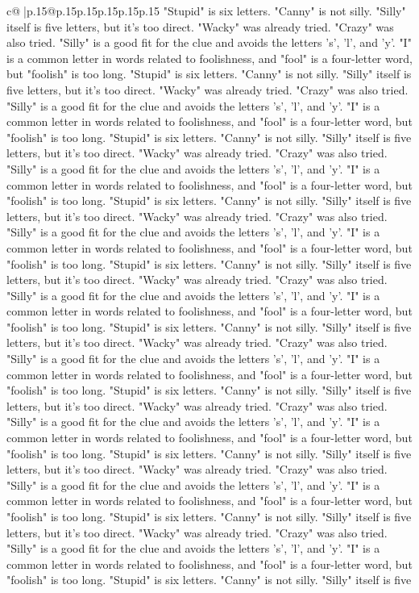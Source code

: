 \documentclass{article}
\begin{document}
{\begin{supertabular}{c@{$\;$}|p{.15\linewidth}@{}p{.15\linewidth}p{.15\linewidth}p{.15\linewidth}p{.15\linewidth}p{.15\linewidth}}
{{{"Stupid" is six letters. "Canny" is not silly. "Silly" itself is five letters, but it's too direct. "Wacky" was already tried. "Crazy" was also tried. "Silly" is a good fit for the clue and avoids the letters 's', 'l', and 'y'. "I" is a common letter in words related to foolishness, and "fool" is a four{-}letter word, but "foolish" is too long. "Stupid" is six letters. "Canny" is not silly. "Silly" itself is five letters, but it's too direct. "Wacky" was already tried. "Crazy" was also tried. "Silly" is a good fit for the clue and avoids the letters 's', 'l', and 'y'. "I" is a common letter in words related to foolishness, and "fool" is a four{-}letter word, but "foolish" is too long. "Stupid" is six letters. "Canny" is not silly. "Silly" itself is five letters, but it's too direct. "Wacky" was already tried. "Crazy" was also tried. "Silly" is a good fit for the clue and avoids the letters 's', 'l', and 'y'. "I" is a common letter in words related to foolishness, and "fool" is a four{-}letter word, but "foolish" is too long. "Stupid" is six letters. "Canny" is not silly. "Silly" itself is five letters, but it's too direct. "Wacky" was already tried. "Crazy" was also tried. "Silly" is a good fit for the clue and avoids the letters 's', 'l', and 'y'. "I" is a common letter in words related to foolishness, and "fool" is a four{-}letter word, but "foolish" is too long. "Stupid" is six letters. "Canny" is not silly. "Silly" itself is five letters, but it's too direct. "Wacky" was already tried. "Crazy" was also tried. "Silly" is a good fit for the clue and avoids the letters 's', 'l', and 'y'. "I" is a common letter in words related to foolishness, and "fool" is a four{-}letter word, but "foolish" is too long. "Stupid" is six letters. "Canny" is not silly. "Silly" itself is five letters, but it's too direct. "Wacky" was already tried. "Crazy" was also tried. "Silly" is a good fit for the clue and avoids the letters 's', 'l', and 'y'. "I" is a common letter in words related to foolishness, and "fool" is a four{-}letter word, but "foolish" is too long. "Stupid" is six letters. "Canny" is not silly. "Silly" itself is five letters, but it's too direct. "Wacky" was already tried. "Crazy" was also tried. "Silly" is a good fit for the clue and avoids the letters 's', 'l', and 'y'. "I" is a common letter in words related to foolishness, and "fool" is a four{-}letter word, but "foolish" is too long. "Stupid" is six letters. "Canny" is not silly. "Silly" itself is five letters, but it's too direct. "Wacky" was already tried. "Crazy" was also tried. "Silly" is a good fit for the clue and avoids the letters 's', 'l', and 'y'. "I" is a common letter in words related to foolishness, and "fool" is a four{-}letter word, but "foolish" is too long. "Stupid" is six letters. "Canny" is not silly. "Silly" itself is five letters, but it's too direct. "Wacky" was already tried. "Crazy" was also tried. "Silly" is a good fit for the clue and avoids the letters 's', 'l', and 'y'. "I" is a common letter in words related to foolishness, and "fool" is a four{-}letter word, but "foolish" is too long. "Stupid" is six letters. "Canny" is not silly. "Silly" itself is five }}}
\end{supertabular}}
\end{document}
